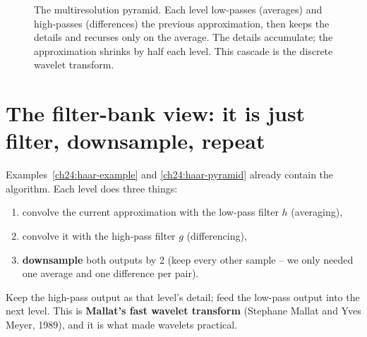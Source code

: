 \begin{figure}[H]
\centering
{}
\caption{The multiresolution pyramid. Each level low-passes (averages) and
high-passes (differences) the previous approximation, then keeps the details and
recurses only on the average. The details accumulate; the approximation shrinks by
half each level. This cascade is the discrete wavelet transform.}
\label{ch24:pyramid}
\end{figure}

\section{The filter-bank view: it is just filter, downsample, repeat}
\label{ch24:filterbank}

Examples~\ref{ch24:haar-example} and \ref{ch24:haar-pyramid} already contain the
algorithm. Each level does three things:
\begin{enumerate}
\item convolve the current approximation with the low-pass filter $h$ (averaging),
\item convolve it with the high-pass filter $g$ (differencing),
\item \textbf{downsample} both outputs by 2 (keep every other sample -- we only
needed one average and one difference per pair).
\end{enumerate}
Keep the high-pass output as that level's detail; feed the low-pass output into
the next level. This is \textbf{Mallat's fast wavelet transform} (Stephane Mallat
and Yves Meyer, 1989), and it is what made wavelets practical.


